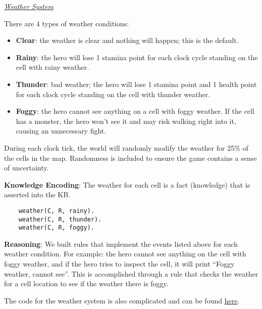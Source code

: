 \documentclass[8pt]{extarticle}
\begin{document}
\begin{multicols*}{2}
\textit{\underline{Weather System}}

There are 4 types of weather conditions:
\begin{itemize}
\item \textbf{Clear}: the weather is clear and nothing will happen; this is the default.
\item \textbf{Rainy}: the hero will lose 1 stamina point for each clock cycle standing on the cell with rainy weather.
\item \textbf{Thunder}: bad weather; the hero will lose 1 stamina point and 1 health point for each clock cycle standing on the cell with thunder weather.
\item \textbf{Foggy}: the hero cannot see anything on a cell with foggy weather. If the cell has a monster, the hero won’t see it and may risk walking right into it, causing an unnecessary fight.
\end{itemize}

During each clock tick, the world will randomly modify the weather for 25\% of the cells in the map. Randomness is included to ensure the game contains a sense of uncertainty.

\textbf{Knowledge Encoding}: The weather for each cell is a fact (knowledge) that is asserted into the KB.

\begin{verbatim}
    weather(C, R, rainy).
    weather(C, R, thunder).
    weather(C, R, foggy).
\end{verbatim}

\textbf{Reasoning}: We built rules that implement the events listed above for each weather condition. For example: the hero cannot see anything on the cell with foggy weather, and if the hero tries to inspect the cell, it will print “Foggy weather, cannot see”. This is accomplished through a rule that checks the weather for a cell location to see if the weather there is foggy.

The code for the weather system is also complicated and can be found \href{https://github.com/lqwk/prolog-adventure/blob/main/src/systems.pl}{here}.




\end{multicols*}
\end{document}

